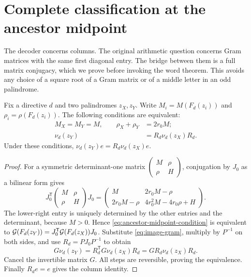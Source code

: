\section{Complete classification at the ancestor midpoint}
\label{sec:midpoint}

The decoder concerns columns. The original arithmetic question concerns
Gram matrices with the same first diagonal entry. The bridge between
them is a full matrix conjugacy, which we prove before invoking the word
theorem. This avoids any choice of a square root of a Gram matrix or of
a middle letter in an odd palindrome.

\begin{lemma}\label{lem:gram-bridge}
Fix a directive $d$ and two palindromes $z_X,z_Y$. Write
$M_i=M(F_d(z_i))$ and $\rho_i=\rho(F_d(z_i))$.
The following conditions are equivalent:
\begin{align}
 M_X=M_Y=M,\qquad \rho_X+\rho_Y&=2r_0M;
 \label{eq:ancestor-midpoint-condition}\\
 \nu_d(z_Y)&=R_d\nu_d(z_X)R_d.
 \label{eq:full-reflection-conjugacy}
\end{align}
Under these conditions,
$\nu_d(z_Y)e=R_d\nu_d(z_X)e$.
\end{lemma}

\begin{proof}
For a symmetric determinant-one matrix
$\left(\begin{smallmatrix}M&\rho\\\rho&H\end{smallmatrix}\right)$,
conjugation by $J_0$ as a bilinear form gives
$$
 J_0^{\mathsf T}
 \begin{pmatrix}M&\rho\\\rho&H\end{pmatrix}J_0
 =\begin{pmatrix}
 M&2r_0M-\rho\\
 2r_0M-\rho&4r_0^2M-4r_0\rho+H
 \end{pmatrix}.
$$
The lower-right entry is uniquely determined by the other entries and
the determinant, because $M>0$. Hence
\eqref{eq:ancestor-midpoint-condition} is equivalent to
$\mathcal{G}(F_d(z_Y))=J_0^{\mathsf T}\mathcal{G}(F_d(z_X))J_0$.
Substitute \eqref{eq:image-gram}, multiply by $P^{-1}$ on both sides,
and use $R_d=PJ_0P^{-1}$ to obtain
$$
 G\nu_d(z_Y)=R_d^{\mathsf T}G\nu_d(z_X)R_d
 =GR_d\nu_d(z_X)R_d.
$$
Cancel the invertible matrix $G$. All steps are reversible, proving
the equivalence. Finally $R_de=e$ gives the column identity.
\end{proof}

